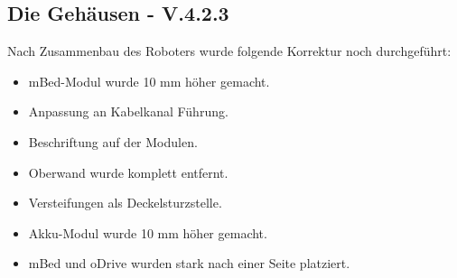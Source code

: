 \subsection{Die Gehäusen - V.4.2.3}

Nach Zusammenbau des Roboters wurde folgende Korrektur noch durchgeführt:
 
\begin{itemize} 
	\item  mBed-Modul wurde 10 mm höher gemacht.
	\item  Anpassung an Kabelkanal Führung.
	\item  Beschriftung auf der Modulen.
	\item  Oberwand wurde komplett entfernt.
	\item  Versteifungen als Deckelsturzstelle.
	\item  Akku-Modul wurde 10 mm höher gemacht.
	\item  mBed und oDrive wurden stark nach einer Seite platziert.
\end{itemize}

